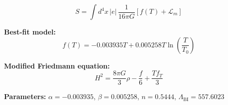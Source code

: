 
\begin{equation}
  S = \int d^4x \, |e| \, \frac{1}{16\pi G} \left[ f(T) + \mathcal{L}_m \right]
\end{equation}

\textbf{Best-fit model:}
\begin{equation}
  f(T) = -0.003935 T + 0.005258 T \ln\!\left(\frac{T}{T_0}\right)
\end{equation}

\textbf{Modified Friedmann equation:}
\begin{equation}
  H^2 = \frac{8\pi G}{3} \rho - \frac{f}{6} + \frac{T f_T}{3}
\end{equation}

\textbf{Parameters:}
$\alpha = -0.003935$, \quad
$\beta = 0.005258$, \quad
$n = 0.5444$, \quad
$\Lambda_{\text{BI}} = 557.6023$
